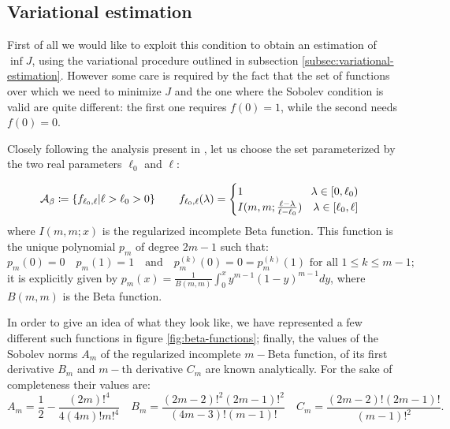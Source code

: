\subsection{Variational estimation}
\label{subsec:V-optimization}

First of all we would like to exploit this condition to obtain an estimation of \(\inf J\), using the variational procedure outlined in subsection \ref{subsec:variational-estimation}. However some care is required by the fact that the set of functions over which we need to minimize \(J\) and the one where the Sobolev condition is valid are quite different: the first one requires \(f(0) = 1\), while the second needs \(f(0) = 0\).

Closely following the analysis present in \cite[]{fewster2020new}, let us choose the set parameterized by the two real parameters \(\ell_0\) and \(\ell\):

\[
\mathcal{A}_{\beta} \coloneqq \left\{f_{\ell_0, \ell} \vert \ell > \ell_0 >0\right\} \quad\quad f_{\ell_0, \ell}(\lambda) = 
\begin{cases}
	1 \hfill \lambda\in [0, \ell_0) \\
	I(m, m; \frac{\ell - \lambda}{\ell - \ell_0}) \quad \hfill \lambda\in [\ell_0, \ell]
\end{cases}
\]
where \(I(m,m;x)\) is the regularized incomplete Beta function. This function is the unique polynomial \(p_m\) of degree \(2m - 1\) such that:
\[
p_m(0) = 0 \quad p_m(1) = 1 \quad\text{and}\quad p^{(k)}_m(0) = 0 = p^{(k)}_m(1)	\text{ for all } 1 \le k \le m - 1;
\]
it is explicitly given by \(p_m(x) = \frac{1}{B(m, m)} \int_0^x y^{m - 1}(1 - y)^{m -1} dy\), where \(B(m,m)\) is the Beta function.

In order to give an idea of what they look like, we have represented a few different such functions in figure \ref{fig:beta-functions}; finally, the values of the Sobolev norms \(A_m\) of the regularized incomplete \(m-\)Beta function, of its first derivative \(B_m\) and \(m-\)th derivative \(C_m\) are known analytically. For the sake of completeness their values are:
\[
A_m = \frac{1}{2} - \frac{(2m)!^4}{4(4m)!m!^4} \quad 
B_m= \frac{(2m-2)!^2(2m-1)!^2}{(4m-3)!(m - 1)!} \quad 
C_m = \frac{(2m-2)!(2m-1)!}{(m-1)!^2}. 
\]

